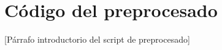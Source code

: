 \chapter{Código del preprocesado}\label{app:preprocesado}

[Párrafo introductorio del script de preprocesado]


